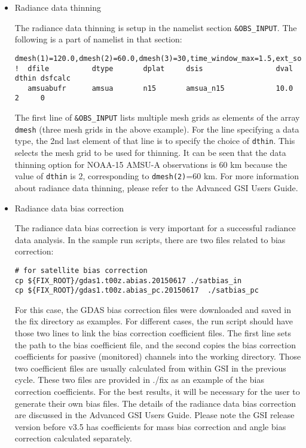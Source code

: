 \begin{itemize}
\item Radiance data thinning

The radiance data thinning is setup in the namelist section \verb|&OBS_INPUT|. The following is a part of namelist in that section:

\begin{scriptsize}
\begin{verbatim}
dmesh(1)=120.0,dmesh(2)=60.0,dmesh(3)=30,time_window_max=1.5,ext_sonde=.true.
!  dfile          dtype       dplat     dsis                 dval    dthin dsfcalc
   amsuabufr      amsua       n15       amsua_n15            10.0     2     0
\end{verbatim}
\end{scriptsize}

The first line of \verb|&OBS_INPUT| lists multiple mesh grids as elements of the array \verb|dmesh| (three mesh grids in the above example). For the line specifying a data type, the 2nd last element of that line is to specify the choice of \verb|dthin|. This selects the mesh grid to be used for thinning. It can be seen that the data thinning option for NOAA-15 AMSU-A observations is 60 km because the value of \verb|dthin| is 2,  corresponding to \verb|dmesh(2)|=60 km.  For more information about radiance data thinning, please refer to the Advanced GSI User\textquotesingle s Guide.\\

\item Radiance data bias correction

The radiance data bias correction is very important for a successful radiance data analysis.  In the sample run scripts, there are two files related to bias correction:

\begin{scriptsize}
\begin{verbatim}
# for satellite bias correction
cp ${FIX_ROOT}/gdas1.t00z.abias.20150617 ./satbias_in
cp ${FIX_ROOT}/gdas1.t00z.abias_pc.20150617  ./satbias_pc
\end{verbatim}
\end{scriptsize}

For this case, the GDAS bias correction files were downloaded and saved in the fix directory as examples. For different cases, the run script should have those two lines to link the bias correction coefficient files. The first line sets the path to the bias coefficient file, and the second copies the bias correction coefficients for passive (monitored) channels into the working directory. Those two coefficient files are usually calculated from within GSI in the previous cycle. These two files are provided in ./fix as an example of the bias correction coefficients. For the best results, it will be necessary for the user to generate their own bias files. The details of the radiance data bias correction are discussed in the Advanced GSI User\textquotesingle s Guide. Please note the GSI release version before v3.5 has coefficients for mass bias correction and angle bias correction calculated separately. \\


\end{itemize}
